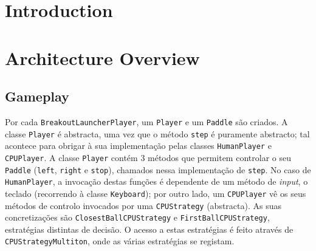 \documentclass[a4paper]{article}
\title{\documentTitle}
\author{\documentAuthors}
\begin{document}
\renewcommand{\figurename}{Figure}
\maketitle
\cleardoublepage

\tableofcontents
\cleardoublepage

\setlength{\parindent}{1cm}
\setlength{\parskip}{0.3cm}

\hyphenation{}


\section{Introduction}
\section{Architecture Overview}



\subsection{Gameplay}
\noindent Por cada \texttt{BreakoutLauncherPlayer}, um \texttt{Player} e um \texttt{Paddle} são criados. A classe \texttt{Player} é abstracta, uma vez que o método \texttt{step} é puramente abstracto; tal acontece para obrigar à sua implementação pelas classes \texttt{HumanPlayer} e \texttt{CPUPlayer}. A classe \texttt{Player} contém 3 métodos que permitem controlar o seu \texttt{Paddle} (\texttt{left}, \texttt{right} e \texttt{stop}), chamados nessa implementação de \texttt{step}. No caso de \texttt{HumanPlayer}, a invocação destas funções é dependente de um método de \textit{input}, o teclado (recorrendo à classe \texttt{Keyboard}); por outro lado, um \texttt{CPUPlayer} vê os seus métodos de controlo invocados por uma \texttt{CPUStrategy} (abstracta). As suas concretizações são \texttt{ClosestBallCPUStrategy} e \texttt{FirstBallCPUStrategy}, estratégias distintas de decisão. O acesso a estas estratégias é feito através de \texttt{CPUStrategyMultiton}, onde as várias estratégias se registam.
\end{document}
